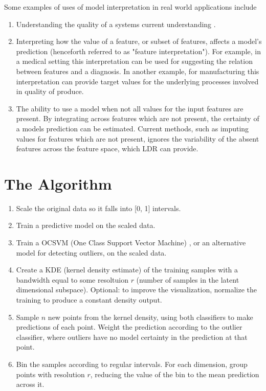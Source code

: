 \documentclass[a4paper, twocolumn]{article}
\begin{document}
Some examples of uses of model interpretation in real world applications include

\begin{enumerate}
\item Understanding the quality of a systems current understanding \cite{amershi2011effective}. 

\item Interpreting how the value of a feature, or subset of features, affects a model's prediction (henceforth referred to as "feature interpretation"). For example, in a medical setting this interpretation can be used for suggesting the relation between features and a diagnosis. In another example, for manufacturing this interpretation can provide target values for the underlying processes involved in quality of produce.

\item The ability to use a model when not all values for the input features are present. By integrating across features which are not present, the certainty of a models prediction can be estimated. Current methods, such as imputing values for features which are not present, ignores the variability of the absent features across the feature space, which LDR can provide.
\end{enumerate}

\section{The Algorithm}

\begin{enumerate}
\item Scale the original data so it falls into [0, 1] intervals.
\item Train a predictive model on the scaled data.
\item Train a OCSVM (One Class Support Vector Machine) \cite{scholkopf2001estimating}, or an alternative model for detecting outliers, on the scaled data.
\item Create a KDE (kernel density estimate) \cite{parzen1962estimation} of the training samples with a bandwidth equal to some resoltuion $r$ (number of samples in the latent dimensional subspace). Optional: to improve the visualization, normalize the training to produce a constant density output.
\item Sample $n$ new points from the kernel density, using both classifiers to make predictions of each point. Weight the prediction according to the outlier classifier, where outliers have no model certainty in the prediction at that point.
\item Bin the samples according to regular intervals. For each dimension, group points with resolution $r$, reducing the value of the bin to the mean prediction across it.
\end{enumerate}
\end{document}
